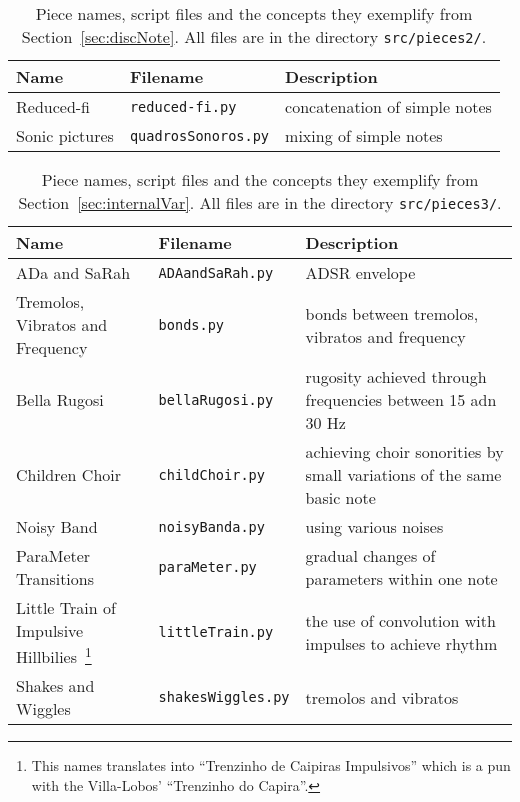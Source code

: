 \documentclass{scrreprt}
\begin{document}
\begin{table*}[htp!]
\centering
\caption{Piece names, script files and the concepts they exemplify from Section~\ref{sec:discNote}. All files are in the directory \texttt{src/pieces2/}.}
\begin{tabular}{ p{5cm} | p{3.5cm} | p{6.2cm} }
   Name & Filename & Description \\\hline
 Reduced-fi & \texttt{reduced-fi.py} & concatenation of simple notes \\
 Sonic pictures & \texttt{quadrosSonoros.py} & mixing of simple notes  \\
\end{tabular}
\end{table*}

\begin{table*}[htp!]
\centering
\caption{Piece names, script files and the concepts they exemplify from Section~\ref{sec:internalVar}. All files are in the directory \texttt{src/pieces3/}.}
\begin{tabular}{ p{5cm} | p{3.5cm} | p{6.2cm} }
   Name & Filename & Description \\\hline
 ADa and SaRah & \texttt{ADAandSaRah.py} & ADSR envelope \\
 Tremolos, Vibratos and Frequency & \texttt{bonds.py} & bonds between tremolos, vibratos and frequency  \\
 Bella Rugosi & \texttt{bellaRugosi.py} & rugosity achieved through frequencies between 15 adn 30 Hz \\
 Children Choir & \texttt{childChoir.py} & achieving choir sonorities by small variations of the same basic note \\
 Noisy Band & \texttt{noisyBanda.py} & using various noises \\
 ParaMeter Transitions & \texttt{paraMeter.py} & gradual changes of parameters within one note \\
 Little Train of Impulsive Hillbilies~\footnote{This names translates into ``Trenzinho de Caipiras Impulsivos'' which is a pun with the Villa-Lobos' ``Trenzinho do Capira''.} & \texttt{littleTrain.py} & the use of convolution with impulses to achieve rhythm \\
 Shakes and Wiggles & \texttt{shakesWiggles.py} &  tremolos and vibratos \\
\end{tabular}
\end{table*}
\end{document}
